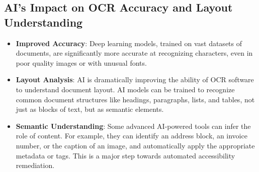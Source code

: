 \subsection{AI's Impact on OCR Accuracy and Layout Understanding}
\label{subsec:ai-ocr-impact}
\begin{itemize}
	\item \textbf{Improved Accuracy}: Deep learning models, trained on vast datasets of documents, are significantly more accurate at recognizing characters, even in poor quality images or with unusual fonts.
	\item \textbf{Layout Analysis}: AI is dramatically improving the ability of OCR software to understand document layout. AI models can be trained to recognize common document structures like headings, paragraphs, lists, and tables, not just as blocks of text, but as semantic elements.
	\item \textbf{Semantic Understanding}: Some advanced AI-powered tools can infer the role of content. For example, they can identify an address block, an invoice number, or the caption of an image, and automatically apply the appropriate metadata or tags. This is a major step towards automated accessibility remediation.
\end{itemize}

